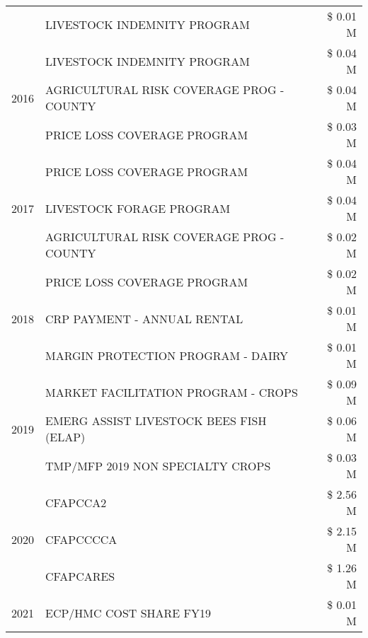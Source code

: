 \begin{tabular}{llr}
 & LIVESTOCK INDEMNITY PROGRAM & \$ 0.01 M \\
\cline{1-3}
\multirow[t]{3}{*}{2016} & LIVESTOCK INDEMNITY PROGRAM                   & \$ 0.04 M \\
 & AGRICULTURAL RISK COVERAGE PROG - COUNTY      & \$ 0.04 M \\
 & PRICE LOSS COVERAGE PROGRAM                   & \$ 0.03 M \\
\cline{1-3}
\multirow[t]{3}{*}{2017} & PRICE LOSS COVERAGE PROGRAM & \$ 0.04 M \\
 & LIVESTOCK FORAGE PROGRAM & \$ 0.04 M \\
 & AGRICULTURAL RISK COVERAGE PROG - COUNTY & \$ 0.02 M \\
\cline{1-3}
\multirow[t]{3}{*}{2018} & PRICE LOSS COVERAGE PROGRAM & \$ 0.02 M \\
 & CRP PAYMENT - ANNUAL RENTAL & \$ 0.01 M \\
 & MARGIN PROTECTION PROGRAM - DAIRY & \$ 0.01 M \\
\cline{1-3}
\multirow[t]{3}{*}{2019} & MARKET FACILITATION PROGRAM - CROPS & \$ 0.09 M \\
 & EMERG ASSIST LIVESTOCK BEES FISH (ELAP) & \$ 0.06 M \\
 & TMP/MFP 2019 NON SPECIALTY CROPS & \$ 0.03 M \\
\cline{1-3}
\multirow[t]{3}{*}{2020} & CFAPCCA2 & \$ 2.56 M \\
 & CFAPCCCCA & \$ 2.15 M \\
 & CFAPCARES & \$ 1.26 M \\
\cline{1-3}
2021 & ECP/HMC COST SHARE FY19 & \$ 0.01 M \\
\cline{1-3}
\bottomrule
\end{tabular}
